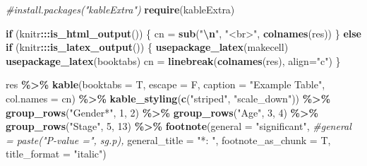 \documentclass[
]{article}
\newenvironment{Shaded}{\begin{snugshade}}{\end{snugshade}}
\newcommand{\AttributeTok}[1]{\textcolor[rgb]{0.13,0.29,0.53}{#1}}
\newcommand{\CommentTok}[1]{\textcolor[rgb]{0.56,0.35,0.01}{\textit{#1}}}
\newcommand{\ControlFlowTok}[1]{\textcolor[rgb]{0.13,0.29,0.53}{\textbf{#1}}}
\newcommand{\DecValTok}[1]{\textcolor[rgb]{0.00,0.00,0.81}{#1}}
\newcommand{\FunctionTok}[1]{\textcolor[rgb]{0.13,0.29,0.53}{\textbf{#1}}}
\newcommand{\NormalTok}[1]{#1}
\newcommand{\OtherTok}[1]{\textcolor[rgb]{0.56,0.35,0.01}{#1}}
\newcommand{\SpecialCharTok}[1]{\textcolor[rgb]{0.81,0.36,0.00}{\textbf{#1}}}
\newcommand{\StringTok}[1]{\textcolor[rgb]{0.31,0.60,0.02}{#1}}
\begin{document}
\begin{Shaded}
\begin{Highlighting}[]
\CommentTok{\#install.packages("kableExtra")}
\FunctionTok{require}\NormalTok{(kableExtra)}

\ControlFlowTok{if}\NormalTok{ (knitr}\SpecialCharTok{:::}\FunctionTok{is\_html\_output}\NormalTok{()) \{}
\NormalTok{    cn }\OtherTok{=} \FunctionTok{sub}\NormalTok{(}\StringTok{"}\SpecialCharTok{\textbackslash{}n}\StringTok{"}\NormalTok{, }\StringTok{"\textless{}br\textgreater{}"}\NormalTok{, }\FunctionTok{colnames}\NormalTok{(res))}
\NormalTok{\} }\ControlFlowTok{else} \ControlFlowTok{if}\NormalTok{ (knitr}\SpecialCharTok{:::}\FunctionTok{is\_latex\_output}\NormalTok{()) \{}
    \FunctionTok{usepackage\_latex}\NormalTok{(}\StringTok{\textquotesingle{}makecell\textquotesingle{}}\NormalTok{)}
    \FunctionTok{usepackage\_latex}\NormalTok{(}\StringTok{\textquotesingle{}booktabs\textquotesingle{}}\NormalTok{)}
\NormalTok{    cn }\OtherTok{=} \FunctionTok{linebreak}\NormalTok{(}\FunctionTok{colnames}\NormalTok{(res), }\AttributeTok{align=}\StringTok{"c"}\NormalTok{)}
\NormalTok{\}   }

\NormalTok{res }\SpecialCharTok{\%\textgreater{}\%}
    \FunctionTok{kable}\NormalTok{(}\AttributeTok{booktabs =}\NormalTok{ T, }\AttributeTok{escape =}\NormalTok{ F, }\AttributeTok{caption =} \StringTok{"Example Table"}\NormalTok{,}
        \AttributeTok{col.names =}\NormalTok{ cn) }\SpecialCharTok{\%\textgreater{}\%}
    \FunctionTok{kable\_styling}\NormalTok{(}\FunctionTok{c}\NormalTok{(}\StringTok{"striped"}\NormalTok{, }\StringTok{"scale\_down"}\NormalTok{)) }\SpecialCharTok{\%\textgreater{}\%}
    \FunctionTok{group\_rows}\NormalTok{(}\StringTok{"Gender*"}\NormalTok{, }\DecValTok{1}\NormalTok{, }\DecValTok{2}\NormalTok{) }\SpecialCharTok{\%\textgreater{}\%} 
    \FunctionTok{group\_rows}\NormalTok{(}\StringTok{"Age"}\NormalTok{, }\DecValTok{3}\NormalTok{, }\DecValTok{4}\NormalTok{) }\SpecialCharTok{\%\textgreater{}\%} 
    \FunctionTok{group\_rows}\NormalTok{(}\StringTok{"Stage"}\NormalTok{, }\DecValTok{5}\NormalTok{, }\DecValTok{13}\NormalTok{) }\SpecialCharTok{\%\textgreater{}\%} 
    \FunctionTok{footnote}\NormalTok{(}\AttributeTok{general =} \StringTok{"significant"}\NormalTok{,}
             \CommentTok{\#general = paste("P{-}value =", sg.p), }
             \AttributeTok{general\_title =} \StringTok{"*: "}\NormalTok{, }
             \AttributeTok{footnote\_as\_chunk =}\NormalTok{ T, }\AttributeTok{title\_format =} \StringTok{"italic"}\NormalTok{)}
\end{Highlighting}
\end{Shaded}
\end{document}
